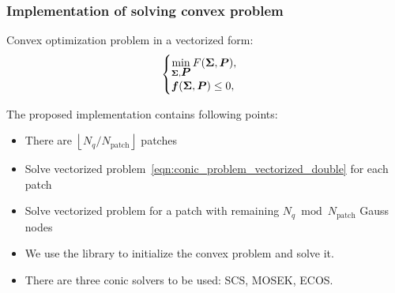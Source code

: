 \documentclass[9pt]{beamer}
\begin{document}
\begin{frame}[fragile]
  \frametitle{Implementation of solving convex problem}

  Convex optimization problem in a vectorized form:
  \begin{equation}
    \label{eqn:conic_problem_vectorized_double}
    \begin{cases}
        \min\limits_{\bm{\Sigma}, \mbox{\boldmath $P$}} F(\bm{\Sigma}, \mbox{\boldmath $P$}), \\
        \mbox{\boldmath $f$}(\bm{\Sigma}, \mbox{\boldmath $P$}) \leq 0,
    \end{cases}
  \end{equation}

  The proposed implementation contains following points:
  \begin{itemize}
    \item There are $\left\lfloor N_q / N_\text{patch} \right\rfloor $ patches 
    \item Solve vectorized problem~\eqref{eqn:conic_problem_vectorized_double} for each patch
    \item Solve vectorized problem for a patch with remaining $N_q \bmod N_\text{patch}$ Gauss nodes 
    \item We use the  library to initialize the convex problem and solve it.
    \item There are three conic solvers to be used: SCS, MOSEK, ECOS.
  \end{itemize}

\end{frame}


  
\end{document}
